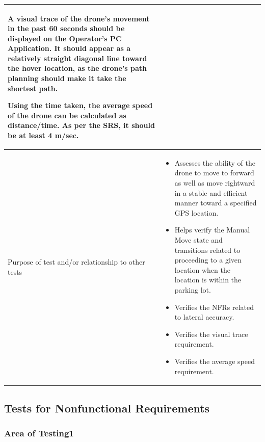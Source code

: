 \documentclass[12pt, titlepage]{article}
\begin{document}
\begin{enumerate}
\begin{table}[!h]
\begin{center}
\begin{tabular}{ | m{3.2cm} | m{12.2cm} | }
A visual trace of the drone's movement in the past 60 seconds should be displayed on the Operator's PC Application. It should appear as a relatively straight diagonal line toward the hover location, as the drone's path planning should make it take the shortest path. 

Using the time taken, the average speed of the drone can be calculated as distance/time. As per the SRS, it should be at least 4 m/sec. 
 \\ 
\hline
Purpose of test and/or relationship to other tests & 
\begin{itemize}
    \item Assesses the ability of the drone to move to forward as well as move rightward in a stable and efficient manner toward a specified GPS location.
    \item Helps verify the Manual Move state and transitions related to proceeding to a given location when the location is within the parking lot.
    \item Verifies the NFRs related to lateral accuracy. 
    \item Verifies the visual trace requirement. 
    \item Verifies the average speed requirement. 
\end{itemize}
\\ 
\hline
\end{tabular}
\end{center}
\end{table}



\subsection{Tests for Nonfunctional Requirements}




\subsubsection{Area of Testing1}
		

\end{enumerate}
\end{document}
